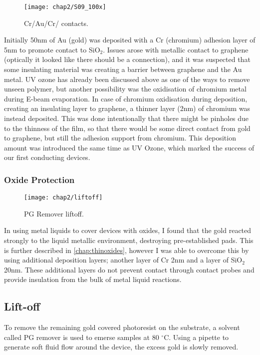 \documentclass[../../Matt_Gebert_Honours_Thesis.tex]{subfiles}
\begin{document}
	\begin{wrapfigure}[10]{r}[0pt]{7.5cm}
		\vspace{-0.5cm}
		\centering
		\texttt{[image: chap2/S09\_100x]}
		\caption[Deposition contacts]{Cr/Au/Cr/\silicondioxide{} contacts.}\label{fig:depos_pads}
	\end{wrapfigure}
	Initially 50nm of Au (gold) was deposited with a Cr (chromium) adhesion layer of 5nm to promote contact to SiO$_2$. Issues arose with metallic contact to graphene (optically it looked like there should be a connection), and it was suspected that some insulating material was creating a barrier between graphene and the Au metal. UV ozone has already been discussed above as one of the ways to remove unseen polymer, but another possibility was the oxidisation of chromium metal during E-beam evaporation.
	In case of chromium oxidisation during deposition, creating an insulating layer to graphene, a thinner layer (2nm) of chromium was instead deposited. This was done intentionally that there might be pinholes due to the thinness of the film, so that there would be some direct contact from gold to graphene, but still the adhesion support from chromium. 
	This deposition amount was introduced the same time as UV Ozone, which marked the success of our first conducting devices.
	
	\subsubsection{Oxide Protection}\label{sec:deposition_oxide_protection}
	
	\begin{wrapfigure}[13]{r}[0pt]{5.5cm}
		\vspace{-1cm}
		\centering
		\texttt{[image: chap2/liftoff]}
		\caption{PG Remover liftoff.}\label{fig:liftoff}
	\end{wrapfigure}
	In using metal liquids to cover devices with oxides, I found that the gold reacted strongly to the liquid metallic environment, destroying pre-established pads. This is further described in \cref{chap:thinoxides}, however I was able to overcome this by using additional deposition layers; another layer of Cr 2nm and a layer of SiO$_2$ 20nm. These additional layers do not prevent contact through contact probes and provide insulation from the bulk of metal liquid reactions.
	
	\subsection{Lift-off}\label{sec:liftoff}
	To remove the remaining gold covered photoresist on the substrate, a solvent called PG remover is used to emerse samples at 80 $^\circ$C. Using a pipette to generate soft fluid flow around the device, the excess gold is slowly removed. 
	
\end{document}
